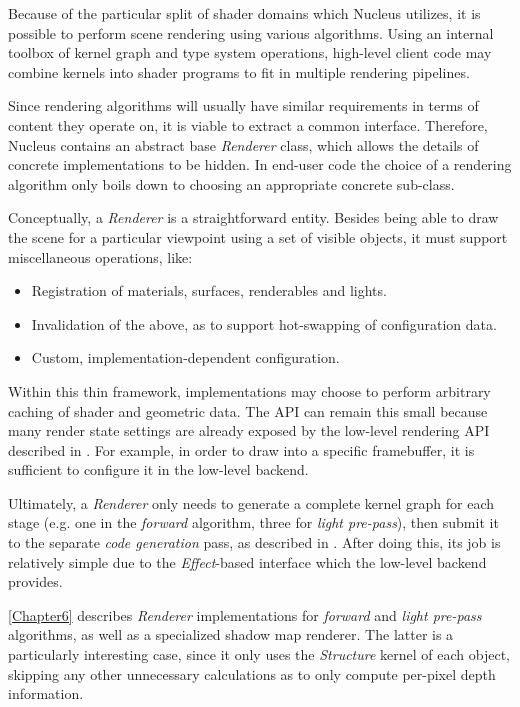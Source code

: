 Because of the particular split of shader domains which Nucleus utilizes, it is possible to perform scene rendering using various algorithms. Using an internal toolbox of kernel graph and type system operations, high-level client code may combine kernels into shader programs to fit in multiple rendering pipelines.

Since rendering algorithms will usually have similar requirements in terms of content they operate on, it is viable to extract a common interface. Therefore, Nucleus contains an abstract base \emph{Renderer} class, which allows the details of concrete implementations to be hidden. In end-user code the choice of a rendering algorithm only boils down to choosing an appropriate concrete sub-class.

Conceptually, a \emph{Renderer} is a straightforward entity. Besides being able to draw the scene for a particular viewpoint using a set of visible objects, it must support miscellaneous operations, like:

\begin{itemize}
\item Registration of materials, surfaces, renderables and lights.
\item Invalidation of the above, as to support hot-swapping of configuration data.
\item Custom, implementation-dependent configuration.
\end{itemize}

Within this thin framework, implementations may choose to perform arbitrary caching of shader and geometric data. The API can remain this small because many render state settings are already exposed by the low-level rendering API described in . For example, in order to draw into a specific framebuffer, it is sufficient to configure it in the low-level backend.

Ultimately, a \emph{Renderer} only needs to generate a complete kernel graph for each stage (e.g. one in the \emph{forward} algorithm, three for \emph{light pre-pass}), then submit it to the separate \emph{code generation} pass, as described in . After doing this, its job is relatively simple due to the \emph{Effect}-based interface which the low-level backend provides.

\cref{Chapter6} describes \emph{Renderer} implementations for \emph{forward} and \emph{light pre-pass} algorithms, as well as a specialized shadow map renderer. The latter is a particularly interesting case, since it only uses the \emph{Structure} kernel of each object, skipping any other unnecessary calculations as to only compute per-pixel depth information.

